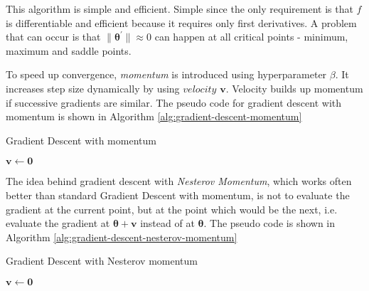 This algorithm is simple and efficient. Simple since the only requirement is that $f$ is differentiable and efficient because it requires only first derivatives. A problem that can occur is that $\| \pmb \theta^{'}\|  \approx 0$ can happen at all critical points - minimum, maximum and saddle points.

To speed up convergence, \textit{momentum} is introduced using hyperparameter $\beta$. It increases step size dynamically by using $velocity$ $\pmb v$. Velocity builds up momentum if successive gradients are similar. The pseudo code for gradient descent with momentum is shown in Algorithm \ref{alg:gradient-descent-momentum}

\begin{algorithm}[htb]
\caption{Gradient Descent with momentum}
\label{alg:gradient-descent-momentum}


$\pmb v \leftarrow \pmb 0$\;
\end{algorithm}

The idea behind gradient descent with \textit{Nesterov Momentum}, which works often better than standard Gradient Descent with momentum, is not to evaluate the gradient at the current point, but at the point which would be the next, i.e. evaluate the gradient at $\pmb \theta + \pmb v$ instead of at $\pmb \theta$. The pseudo code is shown in Algorithm \ref{alg:gradient-descent-nesterov-momentum}

\begin{algorithm}[htb]
\caption{Gradient Descent with Nesterov momentum}
\label{alg:gradient-descent-nesterov-momentum}


$\pmb v \leftarrow \pmb 0$ \;
\end{algorithm}

